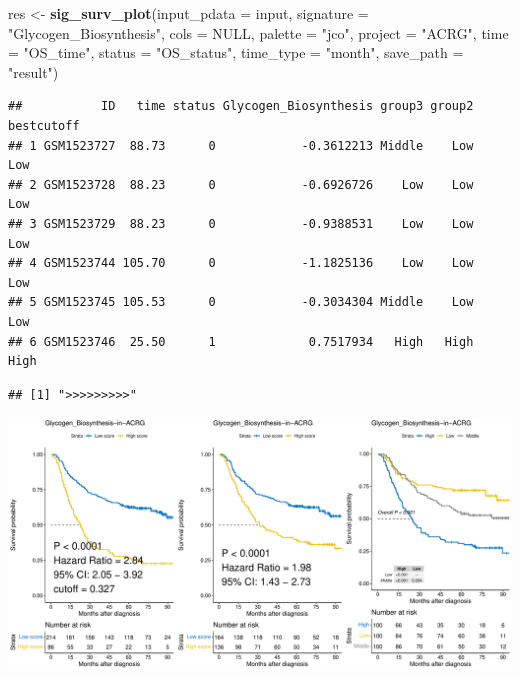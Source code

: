 \documentclass[
  12pt,
]{book}
\newenvironment{Shaded}{\begin{snugshade}}{\end{snugshade}}
\newcommand{\AttributeTok}[1]{\textcolor[rgb]{0.13,0.29,0.53}{#1}}
\newcommand{\ConstantTok}[1]{\textcolor[rgb]{0.56,0.35,0.01}{#1}}
\newcommand{\FunctionTok}[1]{\textcolor[rgb]{0.13,0.29,0.53}{\textbf{#1}}}
\newcommand{\NormalTok}[1]{#1}
\newcommand{\OtherTok}[1]{\textcolor[rgb]{0.56,0.35,0.01}{#1}}
\newcommand{\SpecialCharTok}[1]{\textcolor[rgb]{0.81,0.36,0.00}{\textbf{#1}}}
\newcommand{\StringTok}[1]{\textcolor[rgb]{0.31,0.60,0.02}{#1}}
\theoremstyle{definition}
\theoremstyle{definition}
\theoremstyle{definition}
\theoremstyle{definition}
\theoremstyle{remark}
\begin{document}
\begin{Shaded}
\begin{Highlighting}[]
\NormalTok{res }\OtherTok{\textless{}{-}}       \FunctionTok{sig\_surv\_plot}\NormalTok{(}\AttributeTok{input\_pdata       =}\NormalTok{ input, }
                           \AttributeTok{signature         =} \StringTok{"Glycogen\_Biosynthesis"}\NormalTok{,}
                           \AttributeTok{cols              =} \ConstantTok{NULL}\NormalTok{, }
                           \AttributeTok{palette           =} \StringTok{"jco"}\NormalTok{,}
                           \AttributeTok{project           =} \StringTok{"ACRG"}\NormalTok{,}
                           \AttributeTok{time              =} \StringTok{"OS\_time"}\NormalTok{,}
                           \AttributeTok{status            =} \StringTok{"OS\_status"}\NormalTok{,}
                           \AttributeTok{time\_type         =} \StringTok{"month"}\NormalTok{,}
                           \AttributeTok{save\_path         =} \StringTok{"result"}\NormalTok{)}
\end{Highlighting}
\end{Shaded}

\begin{verbatim}
##           ID   time status Glycogen_Biosynthesis group3 group2 bestcutoff
## 1 GSM1523727  88.73      0            -0.3612213 Middle    Low        Low
## 2 GSM1523728  88.23      0            -0.6926726    Low    Low        Low
## 3 GSM1523729  88.23      0            -0.9388531    Low    Low        Low
## 4 GSM1523744 105.70      0            -1.1825136    Low    Low        Low
## 5 GSM1523745 105.53      0            -0.3034304 Middle    Low        Low
## 6 GSM1523746  25.50      1             0.7517934   High   High       High
\end{verbatim}

\begin{verbatim}
## [1] ">>>>>>>>>"
\end{verbatim}

\begin{Shaded}
\end{Shaded}

\includegraphics{_main_files/figure-latex/unnamed-chunk-49-1.pdf}
\end{document}
